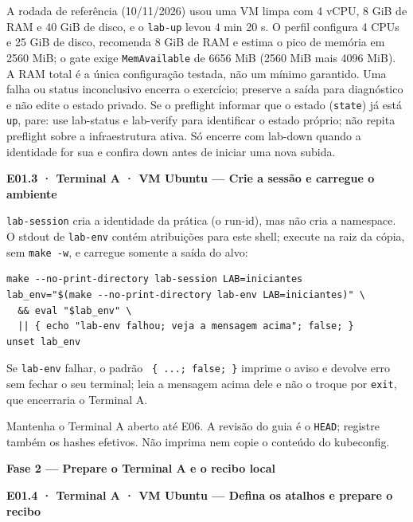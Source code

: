 \documentclass[12pt,openany,oneside,a4paper,chapter=TITLE,english,brazil]{abntex2}
\begin{document}
A rodada de referência (10/11/2026) usou uma VM limpa com 4 vCPU, 8 GiB de RAM e 40 GiB de disco, e o \texttt{lab-{}\allowbreak{}up} levou 4 min 20 s. O perfil configura 4 CPUs e 25 GiB de disco, recomenda 8 GiB de RAM e estima o pico de memória em 2560 MiB; o gate exige \texttt{Mem\allowbreak{}Available} de 6656 MiB (2560 MiB mais 4096 MiB). A RAM total é a única configuração testada, não um mínimo garantido.
Uma falha ou status inconclusivo encerra o exercício; preserve a saída para
diagnóstico e não edite o estado privado. Se o preflight informar que o estado (\texttt{state}) já está \texttt{up}, pare: use lab-status e lab-verify para identificar o estado próprio; não repita preflight sobre a infraestrutura ativa. Só encerre com lab-down quando a identidade for sua e confira down antes de iniciar uma nova subida.

\textbf{E01.3 · Terminal A · VM Ubuntu --- Crie a sessão e carregue o ambiente}

\texttt{lab-{}\allowbreak{}session} cria a identidade da prática (o run-id), mas não cria a namespace.
O stdout de \texttt{lab-{}\allowbreak{}env} contém atribuições para este shell; execute na raiz da
cópia, sem \texttt{make -{}\allowbreak{}w}, e carregue somente a saída do alvo:

\begin{verbatim}
make --no-print-directory lab-session LAB=iniciantes
lab_env="$(make --no-print-directory lab-env LAB=iniciantes)" \
  && eval "$lab_env" \
  || { echo "lab-env falhou; veja a mensagem acima"; false; }
unset lab_env
\end{verbatim}

Se \texttt{lab-{}\allowbreak{}env} falhar, o padrão \texttt{\textbar{}\allowbreak{}\textbar{}\allowbreak{} \{ .\allowbreak{}.\allowbreak{}.\allowbreak{}; false; \}} imprime o aviso e devolve erro
sem fechar o seu terminal; leia a mensagem acima dele e não o troque por \texttt{exit},
que encerraria o Terminal A.

Mantenha o Terminal A aberto até E06. A revisão do guia é o \texttt{HEAD}; registre
também os hashes efetivos. Não imprima nem copie o conteúdo do kubeconfig.

\textbf{Fase 2 --- Prepare o Terminal A e o recibo local}


\textbf{E01.4 · Terminal A · VM Ubuntu --- Defina os atalhos e prepare o recibo}

\hypertarget{p010-e01-4-preparacao}{}
\end{document}
